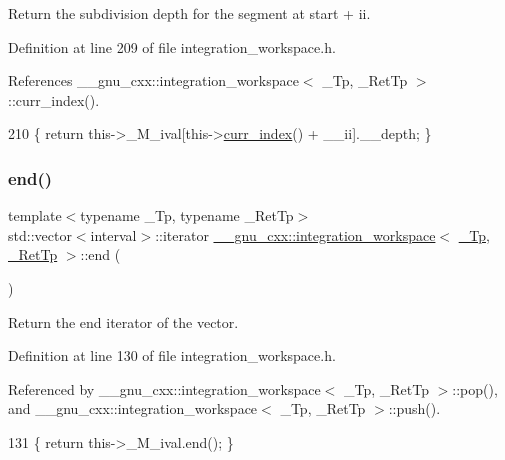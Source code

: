 Return the subdivision depth for the segment at start + ii. 

Definition at line 209 of file integration\+\_\+workspace.\+h.



References \+\_\+\+\_\+gnu\+\_\+cxx\+::integration\+\_\+workspace$<$ \+\_\+\+Tp, \+\_\+\+Ret\+Tp $>$\+::curr\+\_\+index().


\begin{DoxyCode}
210       \{ \textcolor{keywordflow}{return} this->\_M\_ival[this->\hyperlink{class____gnu__cxx_1_1integration__workspace_a51a384b1777615943add69f1895454f5}{curr\_index}() + \_\_ii].\_\_depth; \}
\end{DoxyCode}
\mbox{\label{class____gnu__cxx_1_1integration__workspace_a0494e3b36de996e0a85552aaaac11c03}} 
\subsubsection{\texorpdfstring{end()}{end()}}
{\footnotesize\ttfamily template$<$typename \+\_\+\+Tp, typename \+\_\+\+Ret\+Tp$>$ \\
std\+::vector$<$interval$>$\+::iterator \hyperlink{class____gnu__cxx_1_1integration__workspace}{\+\_\+\+\_\+gnu\+\_\+cxx\+::integration\+\_\+workspace}$<$ \hyperlink{namespace____gnu__cxx_a3b19a9c800ca194374ef9172290f7d79}{\+\_\+\+Tp}, \hyperlink{namespace____gnu__cxx_a886e03ece3d53ff7fa6c098a40f93fa5}{\+\_\+\+Ret\+Tp} $>$\+::end (\begin{DoxyParamCaption}{ }\end{DoxyParamCaption})\hspace{0.3cm}{\ttfamily [inline]}}

Return the end iterator of the vector. 

Definition at line 130 of file integration\+\_\+workspace.\+h.



Referenced by \+\_\+\+\_\+gnu\+\_\+cxx\+::integration\+\_\+workspace$<$ \+\_\+\+Tp, \+\_\+\+Ret\+Tp $>$\+::pop(), and \+\_\+\+\_\+gnu\+\_\+cxx\+::integration\+\_\+workspace$<$ \+\_\+\+Tp, \+\_\+\+Ret\+Tp $>$\+::push().


\begin{DoxyCode}
131       \{ \textcolor{keywordflow}{return} this->\_M\_ival.end(); \}
\end{DoxyCode}
\mbox{\label{class____gnu__cxx_1_1integration__workspace_a4ef93ec6c764386c714eefd9d6e75534}} 

